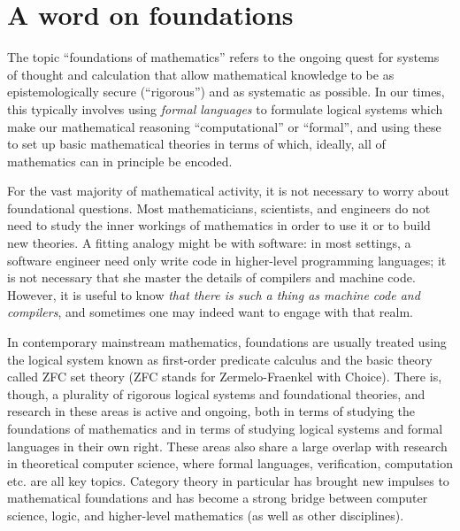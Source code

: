 
\section{A word on foundations}\label{sec:foundations}


The topic ``foundations of mathematics'' refers to the ongoing quest for systems of thought and calculation that allow mathematical knowledge to be as epistemologically secure (``rigorous'') and as systematic as possible.
In our times, this typically involves using \emph{formal languages} to formulate logical systems which make our mathematical reasoning ``computational'' or ``formal'', and using these to set up basic mathematical theories in terms of which, ideally, all of mathematics can in principle be encoded.

For the vast majority of mathematical activity, it is not necessary to worry about foundational questions.
Most mathematicians, scientists, and engineers do not need to study the inner workings of mathematics in order to use it or to build new theories.
A fitting analogy might be with software: in most settings, a software engineer need only write code in higher-level programming languages; it is not necessary that she master the details of compilers and machine code.
However, it is useful to know \emph{that there is such a thing as machine code and compilers}, and sometimes one may indeed want to engage with that realm.

In contemporary mainstream mathematics, foundations are usually treated using the logical system known as first-order predicate calculus and the basic theory called ZFC set theory (ZFC stands for Zermelo-Fraenkel with Choice).
There is, though, a plurality of rigorous logical systems and foundational theories, and research in these areas is active and ongoing, both in terms of studying the foundations of mathematics and in terms of studying logical systems and formal languages in their own right.
These areas also share a large overlap with research in theoretical computer science, where formal languages, verification, computation etc. are all key topics.
Category theory in particular has brought new impulses to mathematical foundations and has become a strong bridge between computer science, logic, and higher-level mathematics (as well as other disciplines).

